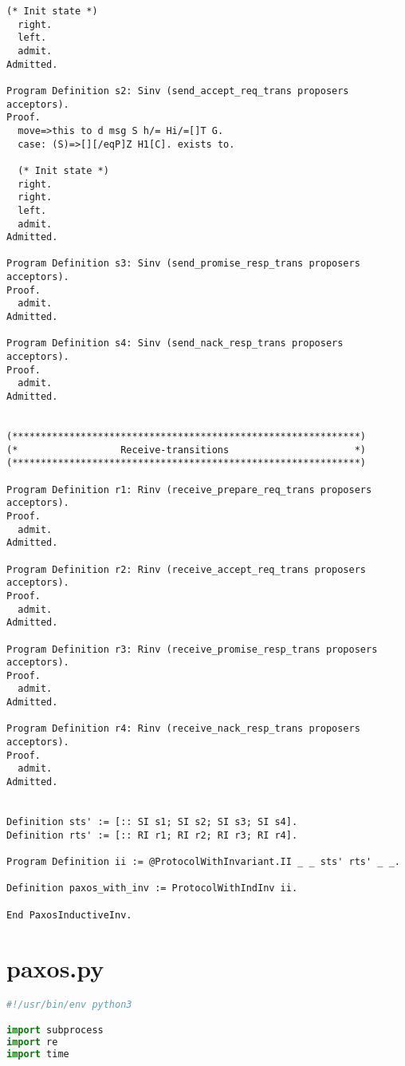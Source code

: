 \begin{landscape}
\begin{multicols*}{2}
\begin{lstlisting}[style=SourceCodeListing]
  (* Init state *)
  right.
  left.
  admit.
Admitted.

Program Definition s2: Sinv (send_accept_req_trans proposers acceptors).
Proof.
  move=>this to d msg S h/= Hi/=[]T G.
  case: (S)=>[][/eqP]Z H1[C]. exists to.

  (* Init state *)
  right.
  right.
  left.
  admit.
Admitted.

Program Definition s3: Sinv (send_promise_resp_trans proposers acceptors).
Proof.
  admit.
Admitted.

Program Definition s4: Sinv (send_nack_resp_trans proposers acceptors).
Proof.
  admit.
Admitted.


(*************************************************************)
(*                  Receive-transitions                      *)
(*************************************************************)

Program Definition r1: Rinv (receive_prepare_req_trans proposers acceptors).
Proof.
  admit.
Admitted.

Program Definition r2: Rinv (receive_accept_req_trans proposers acceptors).
Proof.
  admit.
Admitted.

Program Definition r3: Rinv (receive_promise_resp_trans proposers acceptors).
Proof.
  admit.
Admitted.

Program Definition r4: Rinv (receive_nack_resp_trans proposers acceptors).
Proof.
  admit.
Admitted.


Definition sts' := [:: SI s1; SI s2; SI s3; SI s4].
Definition rts' := [:: RI r1; RI r2; RI r3; RI r4].

Program Definition ii := @ProtocolWithInvariant.II _ _ sts' rts' _ _.

Definition paxos_with_inv := ProtocolWithIndInv ii.

End PaxosInductiveInv.
\end{lstlisting}

\vfill

\section{paxos.py}
\begin{lstlisting}[style=SourceCodeListing, language=Python]
#!/usr/bin/env python3

import subprocess
import re
import time



\end{lstlisting}
\end{multicols*}
\end{landscape}
